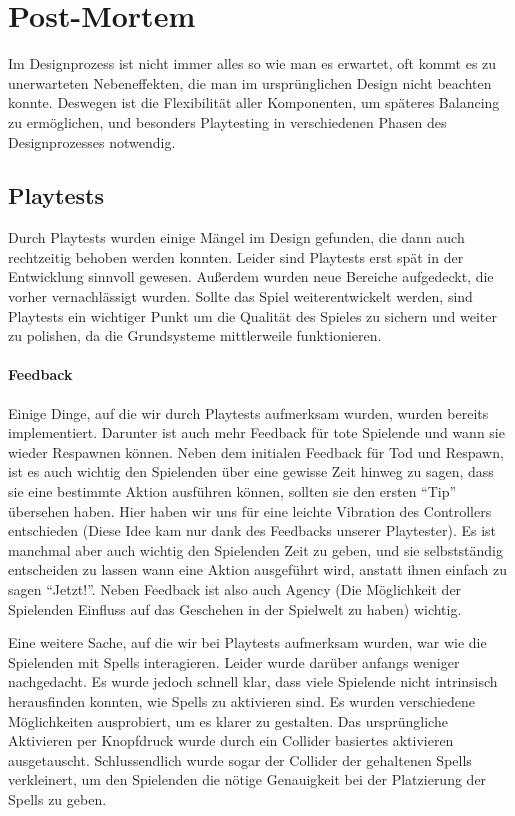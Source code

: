 \chapter{Post-Mortem}

Im Designprozess ist nicht immer alles so wie man es erwartet, oft kommt es zu unerwarteten Nebeneffekten, die man im ursprünglichen Design nicht beachten konnte. Deswegen ist die Flexibilität aller Komponenten, um späteres Balancing zu ermöglichen, und besonders Playtesting in verschiedenen Phasen des Designprozesses notwendig.

\section{Playtests}

Durch Playtests wurden einige Mängel im Design gefunden, die dann auch rechtzeitig behoben werden konnten. Leider sind Playtests erst spät in der Entwicklung sinnvoll gewesen. Außerdem wurden neue Bereiche aufgedeckt, die vorher vernachlässigt wurden. Sollte das Spiel weiterentwickelt werden, sind Playtests ein wichtiger Punkt um die Qualität des Spieles zu sichern und weiter zu polishen, da die Grundsysteme mittlerweile funktionieren.

\subsubsection{Feedback}

Einige Dinge, auf die wir durch Playtests aufmerksam wurden, wurden bereits implementiert. Darunter ist auch mehr Feedback für tote Spielende und wann sie wieder Respawnen können. Neben dem initialen Feedback für Tod und Respawn, ist es auch wichtig den Spielenden über eine gewisse Zeit hinweg zu sagen, dass sie eine bestimmte Aktion ausführen können, sollten sie den ersten "`Tip"' übersehen haben. Hier haben wir uns für eine leichte Vibration des Controllers entschieden (Diese Idee kam nur dank des Feedbacks unserer Playtester). Es ist manchmal aber auch wichtig den Spielenden Zeit zu geben, und sie selbstständig entscheiden zu lassen wann eine Aktion ausgeführt wird, anstatt ihnen einfach zu sagen "`Jetzt!"'. Neben Feedback ist also auch Agency (Die Möglichkeit der Spielenden Einfluss auf das Geschehen in der Spielwelt zu haben\cite[S.98]{_game_design_workshop}) wichtig.

Eine weitere Sache, auf die wir bei Playtests aufmerksam wurden, war wie die Spielenden mit Spells interagieren. Leider wurde darüber anfangs weniger nachgedacht. Es wurde jedoch schnell klar, dass viele Spielende nicht intrinsisch herausfinden konnten, wie Spells zu aktivieren sind. Es wurden verschiedene Möglichkeiten ausprobiert, um es klarer zu gestalten. Das ursprüngliche Aktivieren per Knopfdruck wurde durch ein Collider basiertes aktivieren ausgetauscht. Schlussendlich wurde sogar der Collider der gehaltenen Spells verkleinert, um den Spielenden die nötige Genauigkeit bei der Platzierung der Spells zu geben.

